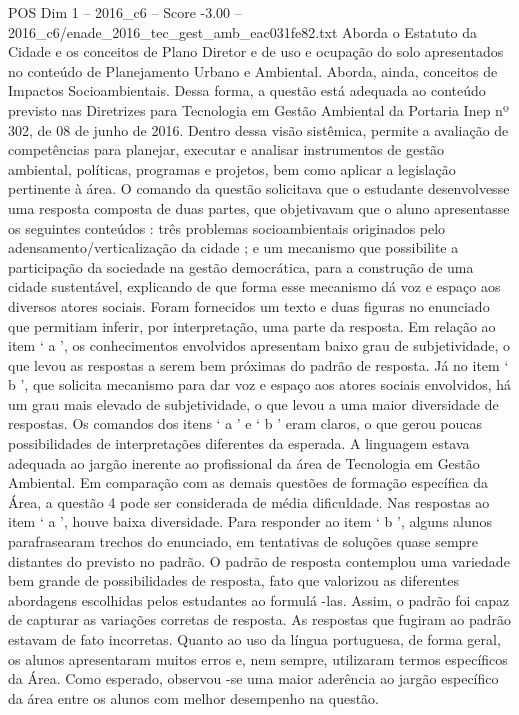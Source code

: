 \begin{textsample}{POS Dim 1 – 2016\_c6 – Score -3.00 – 2016\_c6/enade\_2016\_tec\_gest\_amb\_eac031fe82.txt}
Aborda o Estatuto da Cidade e os conceitos de Plano Diretor e de uso e ocupação do solo apresentados no conteúdo de Planejamento Urbano e Ambiental.
Aborda, ainda, conceitos de Impactos Socioambientais.
Dessa forma, a questão está adequada ao conteúdo previsto nas Diretrizes para Tecnologia em Gestão Ambiental da Portaria Inep nº 302, de 08 de junho de 2016.
Dentro dessa visão sistêmica, permite a avaliação de competências para planejar, executar e analisar instrumentos de gestão ambiental, políticas, programas e projetos, bem como aplicar a legislação pertinente à área.
O comando da questão solicitava que o estudante desenvolvesse uma resposta composta de duas partes, que objetivavam que o aluno apresentasse os seguintes conteúdos : três problemas socioambientais originados pelo adensamento/verticalização da cidade ; e um mecanismo que possibilite a participação da sociedade na gestão democrática, para a construção de uma cidade sustentável, explicando de que forma esse mecanismo dá voz e espaço aos diversos atores sociais.
Foram fornecidos um texto e duas figuras no enunciado que permitiam inferir, por interpretação, uma parte da resposta.
Em relação ao item ‘ a ’, os conhecimentos envolvidos apresentam baixo grau de subjetividade, o que levou as respostas a serem bem próximas do padrão de resposta.
Já no item ‘ b ’, que solicita mecanismo para dar voz e espaço aos atores sociais envolvidos, há um grau mais elevado de subjetividade, o que levou a uma maior diversidade de respostas.
Os comandos dos itens ‘ a ’ e ‘ b ’ eram claros, o que gerou poucas possibilidades de interpretações diferentes da esperada.
A linguagem estava adequada ao jargão inerente ao profissional da área de Tecnologia em Gestão Ambiental.
Em comparação com as demais questões de formação específica da Área, a questão 4 pode ser considerada de média dificuldade.
Nas respostas ao item ‘ a ’, houve baixa diversidade.
Para responder ao item ‘ b ’, alguns alunos parafrasearam trechos do enunciado, em tentativas de soluções quase sempre distantes do previsto no padrão.
O padrão de resposta contemplou uma variedade bem grande de possibilidades de resposta, fato que valorizou as diferentes abordagens escolhidas pelos estudantes ao formulá -las.
Assim, o padrão foi capaz de capturar as variações corretas de resposta.
As respostas que fugiram ao padrão estavam de fato incorretas.
Quanto ao uso da língua portuguesa, de forma geral, os alunos apresentaram muitos erros e, nem sempre, utilizaram termos específicos da Área.
Como esperado, observou -se uma maior aderência ao jargão específico da área entre os alunos com melhor desempenho na questão.

\end{textsample}
